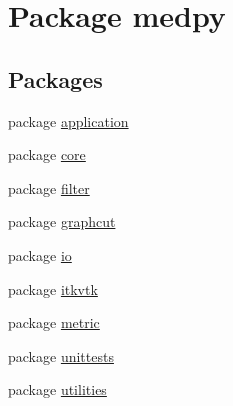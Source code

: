 \hypertarget{namespacemedpy}{
\section{Package medpy}
\label{namespacemedpy}
}
\subsection*{Packages}
\begin{DoxyCompactItemize}
\item 
package \hyperlink{namespacemedpy_1_1application}{application}
\item 
package \hyperlink{namespacemedpy_1_1core}{core}
\item 
package \hyperlink{namespacemedpy_1_1filter}{filter}
\item 
package \hyperlink{namespacemedpy_1_1graphcut}{graphcut}
\item 
package \hyperlink{namespacemedpy_1_1io}{io}
\item 
package \hyperlink{namespacemedpy_1_1itkvtk}{itkvtk}
\item 
package \hyperlink{namespacemedpy_1_1metric}{metric}
\item 
package \hyperlink{namespacemedpy_1_1unittests}{unittests}
\item 
package \hyperlink{namespacemedpy_1_1utilities}{utilities}
\end{DoxyCompactItemize}
